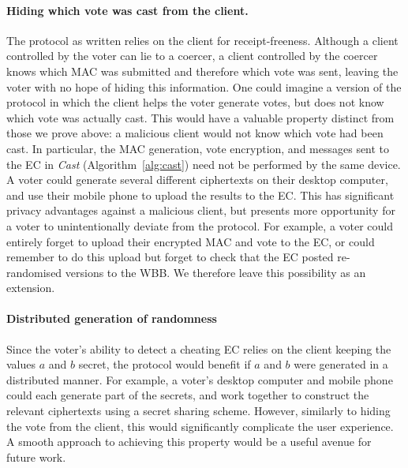 \documentclass[12pt,a4paper]{article}
\theoremstyle{definition}
\begin{document}
\paragraph{Hiding which vote was cast from the client.}
The protocol as written relies on the client for receipt-freeness. Although a client controlled by the voter can lie to a coercer, a client controlled by the coercer knows which MAC was submitted and therefore which vote was sent, leaving the voter with no hope of hiding this information.
One could imagine a version of the protocol in which the client helps the voter generate votes, but does not know which vote was actually cast. This would have a valuable property distinct from those we prove above: a malicious client would not know which vote had been cast. In particular, the MAC generation, vote encryption, and messages sent to the EC in \textit{Cast} (Algorithm~\ref{alg:cast}) need not be performed by the same device. A voter could generate several different ciphertexts on their desktop computer, and use their mobile phone to upload the results to the EC. 
This has significant privacy advantages against a malicious client, but presents more opportunity for a voter to unintentionally deviate from the protocol. For example, a voter could entirely forget to upload their encrypted MAC and vote to the EC, or could remember to do this upload but forget to check that the EC posted re-randomised versions to the WBB. We therefore leave this possibility as an extension.

\paragraph{Distributed generation of randomness}
Since the voter's ability to detect a cheating EC relies on the client keeping the values $a$ and $b$ secret, the protocol would benefit if $a$ and $b$ were generated in a distributed manner. For example, a voter's desktop computer and mobile phone could each generate part of the secrets, and work together to construct the relevant ciphertexts using a secret sharing scheme. However, similarly to hiding the vote from the client, this would significantly complicate the user experience. A smooth approach to achieving this property would be a useful avenue for future work.
\end{document}
